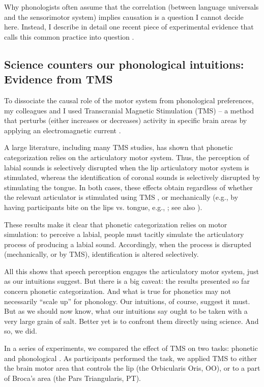 \documentclass[output=paper,colorlinks,citecolor=brown
]{langscibook}
\begin{document}
Why phonologists often assume that the correlation (between language universals and the sensorimotor system) implies causation is a question I cannot decide here. Instead, I describe in detail one recent piece of experimental evidence that calls this common practice into question \citep{berent2023phonetic}. 

\subsection{Science counters our phonological intuitions: Evidence from TMS}

To dissociate the causal role of the motor system from phonological preferences, my colleagues and I used Transcranial Magnetic Stimulation (TMS) -- a method that perturbs (either increases or decreases) activity in specific brain areas by applying an electromagnetic current \citep{rossi2021safety}.  

A large literature, including many TMS studies, has shown that phonetic categorization relies on the articulatory motor system. Thus, the perception of labial sounds is selectively disrupted when the lip articulatory motor system is stimulated, whereas the identification of coronal sounds is selectively disrupted by stimulating the tongue. In both cases, these effects obtain regardless of whether the relevant articulator is stimulated using TMS \citep{d2012role, d2009motor, mottonen2009motor,smalle2015dissociating}, or mechanically (e.g., by having participants bite on the lips vs. tongue, e.g., \cite{bruderer2015sensorimotor}; see also \cite{berent2020speech}). 

These results make it clear that phonetic categorization relies on motor simulation: to perceive a labial, people must tacitly simulate the articulatory process of producing a labial sound. Accordingly, when the process is disrupted (mechanically, or by TMS), identification is altered selectively.  

All this shows that speech perception engages the articulatory motor system, just as our intuitions suggest. But there is a big caveat: the results presented so far concern phonetic categorization. And what is true for phonetics may not necessarily “scale up” for phonology. Our intuitions, of course, suggest it must. But as we should now know, what our intuitions say ought to be taken with a very large grain of salt. Better yet is to confront them directly using science. And so, we did.

In a series of experiments, we compared the effect of TMS on two tasks: phonetic and phonological \citep{berent2023phonetic}. As participants performed the task, we applied TMS to either the brain motor area that controls the lip (the Orbicularis Oris, OO), or to a part of Broca’s area (the Pars Triangularis, PT). 
\end{document}
